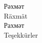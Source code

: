 \documentclass[10pt,xetex]{beamer} %
\begin{document}
\begin{frame}

\begin{Large}
\begin{center}
Рәхмәт \\ 
Räxmät \\
Рахмәт \\ 
Teşekkürler\\
~\\
\smiley
\end{center}
\end{Large}
\end{frame}
\end{document}
